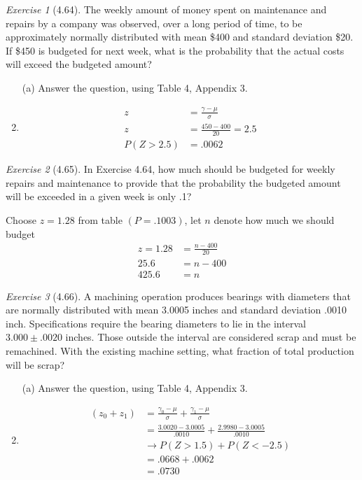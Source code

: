 \documentclass[12pt]{amsart}
\makeatletter
\theoremstyle{remark}
\newtheorem*{exercise}{Exercise}%
\renewenvironment{proof}[1][\proofname]{\par\doublespacing
  \pushQED{\qed}%
  \normalfont \topsep6\p@\@plus6\p@\relax
  \list{}{%
    \settowidth{\leftmargin}{\itshape\proofname:\hskip\labelsep}%
    \setlength{\labelwidth}{0pt}%
    \setlength{\itemindent}{-\leftmargin}%
  }%
  \item[\hskip\labelsep\itshape#1\@addpunct{:}]\ignorespaces
}{%
  \popQED\endlist\@endpefalse
  \singlespacing
}
\theoremstyle{mycomment}
\makeatother
\begin{document}
\begin{exercise}[4.64]
The weekly amount of money spent on maintenance and repairs by a company was observed, over a long period of time, to be approximately normally distributed with mean \$400 and standard deviation \$20. If \$450 is budgeted for next week, what is the probability that the actual costs will exceed the budgeted amount?

\begin{enumerate}
    \item[(a)] Answer the question, using Table 4, Appendix 3.
\begin{proof}[Solution]
	\begin{align*}
		z &= \frac{\gamma - \mu}{\sigma} \\
		z &= \frac{450 - 400}{20} = 2.5 \\
		P(Z > 2.5) &= .0062
	\end{align*}
\end{proof}
\end{enumerate}
\end{exercise}

\begin{exercise}[4.65]
In Exercise 4.64, how much should be budgeted for weekly repairs and maintenance to provide that the probability the budgeted amount will be exceeded in a given week is only .1?

\begin{proof}[Solution]
Choose $z = 1.28$ from table $(P = .1003)$, let $n$ denote how much we should budget
	\begin{align*}
		z = 1.28 &= \frac{n - 400}{20} \\
		25.6 &= n - 400 \\
		425.6 &= n 
	\end{align*}
\end{proof}
\end{exercise}

\begin{exercise}[4.66]
A machining operation produces bearings with diameters that are normally distributed with mean 3.0005 inches and standard deviation .0010 inch. Specifications require the bearing diameters to lie in the interval $3.000 \pm .0020$ inches. Those outside the interval are considered scrap and must be remachined. With the existing machine setting, what fraction of total production will be scrap?

\begin{enumerate}
    \item[(a)] Answer the question, using Table 4, Appendix 3.
\begin{proof}[Solution]
	\begin{align*}
		(z_0 + z_1) &= \frac{\gamma_0 - \mu}{\sigma} + \frac{\gamma_1 - \mu}{\sigma} \\
		&= \frac{3.0020 - 3.0005}{.0010} + \frac{2.9980 - 3.0005}{.0010} \\
		&\to P(Z>1.5) + P(Z < -2.5) \\
		&= .0668 + .0062 \\
		&= .0730
	\end{align*}
\end{proof}
\end{enumerate}
\end{exercise}
\end{document}
